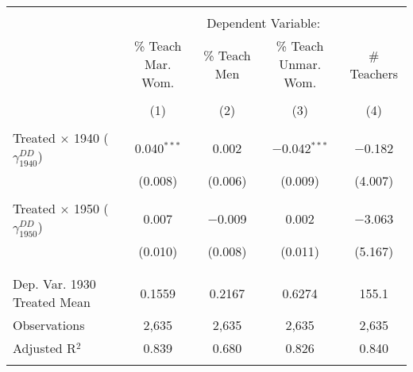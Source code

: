 
\begin{tabular}{@{\extracolsep{5pt}}lcccc} 
\\[-1.8ex]\hline 
\hline \\[-1.8ex] 
 & \multicolumn{4}{c}{Dependent Variable:} \\ 
\cline{2-5} 
 & \% Teach Mar. Wom. & \% Teach Men & \% Teach Unmar. Wom. & \# Teachers \\ 
\\[-1.8ex] & (1) & (2) & (3) & (4)\\ 
\hline \\[-1.8ex] 
 Treated $\times$ 1940 ($\gamma_{1940}^{DD}$) & 0.040$^{***}$ & 0.002 & $-$0.042$^{***}$ & $-$0.182 \\ 
  & (0.008) & (0.006) & (0.009) & (4.007) \\ 
  & & & & \\ 
 Treated $\times$ 1950 ($\gamma_{1950}^{DD}$) & 0.007 & $-$0.009 & 0.002 & $-$3.063 \\ 
  & (0.010) & (0.008) & (0.011) & (5.167) \\ 
  & & & & \\ 
\hline \\[-1.8ex] 
Dep. Var. 1930 Treated Mean & 0.1559 & 0.2167 & 0.6274 & 155.1 \\ 
Observations & 2,635 & 2,635 & 2,635 & 2,635 \\ 
Adjusted R$^{2}$ & 0.839 & 0.680 & 0.826 & 0.840 \\ 
\hline 
\hline \\[-1.8ex] 
\end{tabular} 
